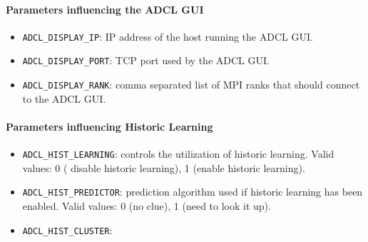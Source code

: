 \paragraph{Parameters influencing the ADCL GUI}
\begin{itemize}
\item {\tt ADCL\_DISPLAY\_IP}: IP address of the host running the ADCL GUI.
\item{\tt ADCL\_DISPLAY\_PORT}: TCP port used by the ADCL GUI.
\item{\tt ADCL\_DISPLAY\_RANK}: comma separated list of MPI ranks that should connect to the
  ADCL GUI. 
\end{itemize}
  

\paragraph{Parameters influencing Historic Learning}
\begin{itemize}
\item{\tt ADCL\_HIST\_LEARNING}: controls the utilization of historic
  learning. Valid values: 0 ( disable historic learning), 1 (enable historic
  learning).

\item{\tt ADCL\_HIST\_PREDICTOR}: prediction algorithm used if historic
  learning has been enabled. Valid values: 0 (no clue), 1 (need to look it
  up).
\item{\tt ADCL\_HIST\_CLUSTER}:
\end{itemize}
